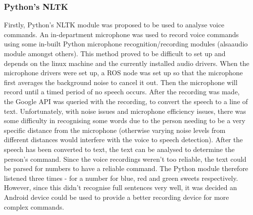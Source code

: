\subsubsection{Python's NLTK}
Firstly, Python's NLTK module was proposed to be used to analyse voice commands. An in-department microphone was used to record voice commands using some in-built Python microphone recognition/recording modules (alsaaudio module amongst others). This method proved to be difficult to set up and depends on the linux machine and the currently installed audio drivers. When the microphone drivers were set up, a ROS node was set up so that the microphone first averages the background noise to cancel it out. Then the microphone will record until a timed period of no speech occurs.
\newline\newline
After the recording was made, the Google API was queried with the recording, to convert the speech to a line of text. Unfortunately, with noise issues and microphone efficiency issues, there was some difficulty in recognising some words due to the person needing to be a very specific distance from the microphone (otherwise varying noise levels from different distances would interfere with the voice to speech detection). After the speech has been converted to text, the text can be analysed to determine the person's command. Since the voice recordings weren't too reliable, the text could be parsed for numbers to have a reliable command. The Python module therefore listened three times - for a number for blue, red and green sweets respectively. However, since this didn't recognise full sentences very well, it was decided an Android device could be used to provide a better recording device for more complex commands.
